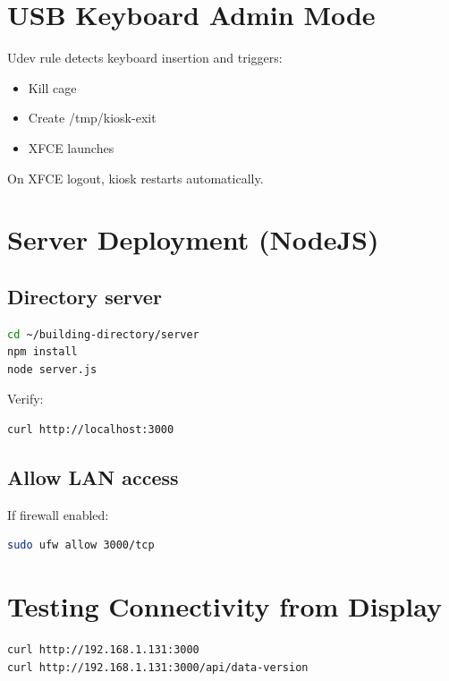 \documentclass[11pt,letterpaper]{article}
\begin{document}
\section{USB Keyboard Admin Mode}

Udev rule detects keyboard insertion and triggers:

\begin{itemize}
\item Kill cage
\item Create /tmp/kiosk-exit
\item XFCE launches
\end{itemize}

On XFCE logout, kiosk restarts automatically.

\section{Server Deployment (NodeJS)}

\subsection{Directory server}

\begin{lstlisting}[language=bash]
cd ~/building-directory/server
npm install
node server.js
\end{lstlisting}

Verify:

\begin{lstlisting}[language=bash]
curl http://localhost:3000
\end{lstlisting}

\subsection{Allow LAN access}

If firewall enabled:

\begin{lstlisting}[language=bash]
sudo ufw allow 3000/tcp
\end{lstlisting}

\section{Testing Connectivity from Display}

\begin{lstlisting}[language=bash]
curl http://192.168.1.131:3000
curl http://192.168.1.131:3000/api/data-version
\end{lstlisting}
\end{document}
